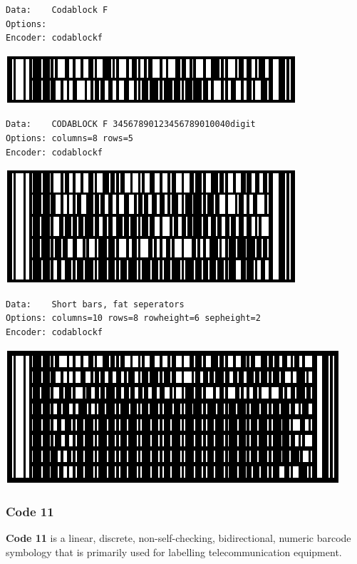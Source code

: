 \begin{verbatim}
Data:    Codablock F
Options: 
Encoder: codablockf
\end{verbatim}

\includegraphics{images/codablockf-1.eps}

\begin{verbatim}
Data:    CODABLOCK F 34567890123456789010040digit
Options: columns=8 rows=5
Encoder: codablockf
\end{verbatim}

\includegraphics{images/codablockf-2.eps}

\begin{verbatim}
Data:    Short bars, fat seperators
Options: columns=10 rows=8 rowheight=6 sepheight=2
Encoder: codablockf
\end{verbatim}

\includegraphics{images/codablockf-3.eps}

\hypertarget{code-11}{%
\subsubsection{Code 11}\label{code-11}}

\textbf{Code 11} is a linear, discrete, non-self-checking,
bidirectional, numeric barcode symbology that is primarily used for
labelling telecommunication equipment.

